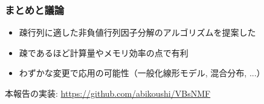 \documentclass[dvipdfmx, dvipsnames]{beamer}
\begin{document}
\begin{frame}
\frametitle{まとめと議論}
\begin{itemize}
\item 疎行列に適した非負値行列因子分解のアルゴリズムを提案した
\item 疎であるほど計算量やメモリ効率の点で有利
\item わずかな変更で応用の可能性（一般化線形モデル, 混合分布, ...）
\end{itemize}

\vfill

本報告の実装: \url{https://github.com/abikoushi/VBsNMF}
\end{frame}
\end{document}
